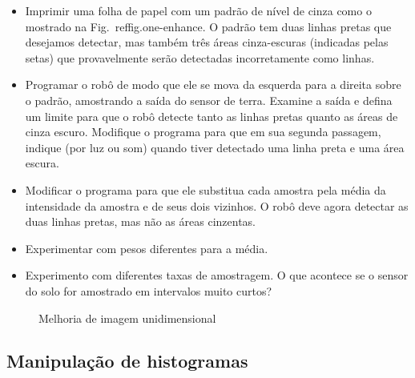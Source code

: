 \begin{framed}
\begin{itemize}
\item Imprimir uma folha de papel com um padrão de nível de cinza como o mostrado na Fig.~ref{fig.one-enhance}. O padrão tem duas linhas pretas que desejamos detectar, mas também três áreas cinza-escuras (indicadas pelas setas) que provavelmente serão detectadas incorretamente como linhas.
\item Programar o robô de modo que ele se mova da esquerda para a direita sobre o padrão, amostrando a saída do sensor de terra. Examine a saída e defina um limite para que o robô detecte tanto as linhas pretas quanto as áreas de cinza escuro. Modifique o programa para que em sua segunda passagem, indique (por luz ou som) quando tiver detectado uma linha preta e uma área escura.
\item Modificar o programa para que ele substitua cada amostra pela média da intensidade da amostra e de seus dois vizinhos. O robô deve agora detectar as duas linhas pretas, mas não as áreas cinzentas.
\item Experimentar com pesos diferentes para a média.
\item Experimento com diferentes taxas de amostragem. O que acontece se o sensor do solo for amostrado em intervalos muito curtos?
\end{itemize}
\end{framed}

\begin{figure}
\begin{center}
\caption{Melhoria de imagem unidimensional}\label{fig.one-enhance}
\end{center}
\end{figure}

\subsection{Manipulação de histogramas}

